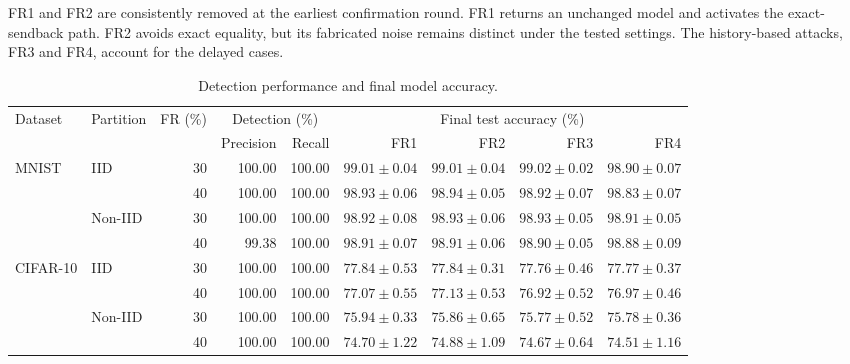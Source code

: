 \documentclass[conference]{IEEEtran}
\begin{document}
FR1 and FR2 are consistently removed at the earliest confirmation round.
FR1 returns an unchanged model and activates the exact-sendback path.
FR2 avoids exact equality, but its fabricated noise remains distinct
under the tested settings. The history-based attacks, FR3 and FR4,
account for the delayed cases.

\begin{table}[!tp]
\centering\footnotesize\setlength{\tabcolsep}{3.5pt}
\caption{Detection performance and final model accuracy.}\label{tab:performance}
\begin{tabular}{llrrrrrrr}
\toprule
\multirow{2}{*}{Dataset} & \multirow{2}{*}{Partition} & \multirow{2}{*}{FR (\%)} & \multicolumn{2}{c}{Detection (\%)} & \multicolumn{4}{c}{Final test accuracy (\%)} \\
\cmidrule(lr){4-5}\cmidrule(lr){6-9}
& & & Precision & Recall & FR1 & FR2 & FR3 & FR4 \\
\midrule
\multirow{4}{*}{MNIST} & \multirow{2}{*}{IID} & 30 & 100.00 & 100.00 & $99.01 \pm 0.04$ & $99.01 \pm 0.04$ & $99.02 \pm 0.02$ & $98.90 \pm 0.07$ \\
 &  & 40 & 100.00 & 100.00 & $98.93 \pm 0.06$ & $98.94 \pm 0.05$ & $98.92 \pm 0.07$ & $98.83 \pm 0.07$ \\
\cmidrule(lr){2-9}
 & \multirow{2}{*}{Non-IID} & 30 & 100.00 & 100.00 & $98.92 \pm 0.08$ & $98.93 \pm 0.06$ & $98.93 \pm 0.05$ & $98.91 \pm 0.05$ \\
 &  & 40 & 99.38 & 100.00 & $98.91 \pm 0.07$ & $98.91 \pm 0.06$ & $98.90 \pm 0.05$ & $98.88 \pm 0.09$ \\
\midrule
\multirow{4}{*}{CIFAR-10} & \multirow{2}{*}{IID} & 30 & 100.00 & 100.00 & $77.84 \pm 0.53$ & $77.84 \pm 0.31$ & $77.76 \pm 0.46$ & $77.77 \pm 0.37$ \\
 &  & 40 & 100.00 & 100.00 & $77.07 \pm 0.55$ & $77.13 \pm 0.53$ & $76.92 \pm 0.52$ & $76.97 \pm 0.46$ \\
\cmidrule(lr){2-9}
 & \multirow{2}{*}{Non-IID} & 30 & 100.00 & 100.00 & $75.94 \pm 0.33$ & $75.86 \pm 0.65$ & $75.77 \pm 0.52$ & $75.78 \pm 0.36$ \\
 &  & 40 & 100.00 & 100.00 & $74.70 \pm 1.22$ & $74.88 \pm 1.09$ & $74.67 \pm 0.64$ & $74.51 \pm 1.16$ \\
\bottomrule
\end{tabular}
\end{table}

\end{document}
